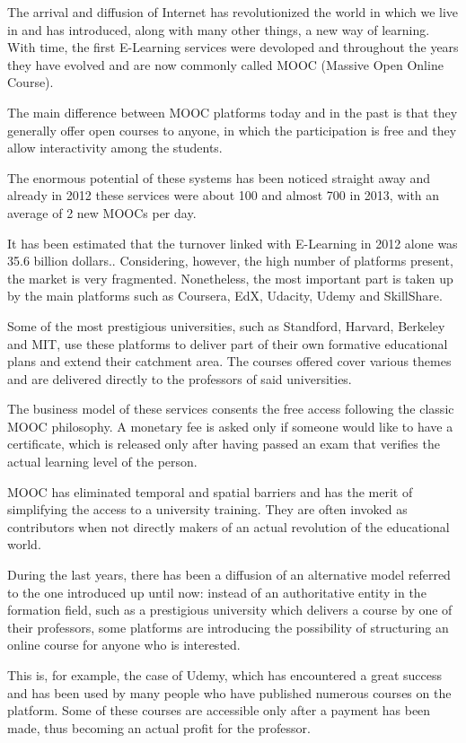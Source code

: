 The arrival and diffusion of Internet has revolutionized the world in which we live in and has introduced, along with many other things, a new way of learning. With time, the first E-Learning services were devoloped and throughout the years they have evolved and are now commonly called MOOC (Massive Open Online Course).

The main difference between MOOC platforms today and in the past is that they generally offer open courses to anyone, in which the participation is free and they allow interactivity among the students.

The enormous potential of these systems has been noticed straight away and already in 2012 these services were about 100 and almost 700 in 2013, with an average of 2 new MOOCs per day.

It has been estimated that the turnover linked with E-Learning in 2012 alone was 35.6 billion dollars.\cite{gallico2015learning}.
Considering, however, the high number of platforms present, the market is very fragmented. Nonetheless, the most important part is taken up by the main platforms such as Coursera, EdX, Udacity, Udemy and SkillShare.

Some of the most prestigious universities, such as Standford, Harvard, Berkeley and MIT, use these platforms to deliver part of their own formative educational plans and extend their catchment area.
The courses offered cover various themes and are delivered directly to the professors of said universities.

The business model of these services consents the free access following the classic MOOC philosophy. A monetary fee is asked only if someone would like to have a certificate, which is released only after having passed an exam that verifies the actual learning level of the person.

MOOC has eliminated temporal and spatial barriers and has the merit of simplifying the access to a university training. They are often invoked as contributors when not directly makers of an actual revolution of the educational world.

During the last years, there has been a diffusion of an alternative model referred to the one introduced up until now: instead of an authoritative entity in the formation field, such as a prestigious university which delivers a course by one of their professors, some platforms are introducing the possibility of structuring an online course for anyone who is interested.

This is, for example, the case of Udemy, which has encountered a great success and has been used by many people who have published numerous courses on the platform. Some of these courses are accessible only after a payment has been made, thus becoming an actual profit for the professor.


